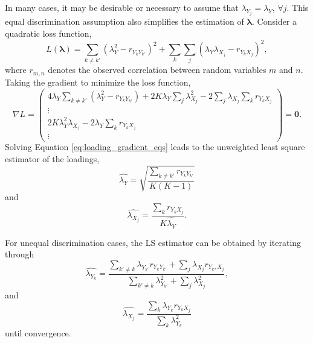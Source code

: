 \documentclass[man, floatsintext]{apa7}
\newcommand{\mbf}[1]{\bm{#1}}
\newcommand{\blambda}{\mbf{\lambda}}
\begin{document}
  In many cases, it may be desirable or necessary to assume that $\lambda_{Y_j}
  = \lambda_{Y}$, $\forall j$. This equal discrimination assumption also
  simplifies the estimation of $\blambda$. Consider a quadratic loss function,
  \begin{equation}
    L(\blambda) = \sum_{k \neq k'} (\lambda_{Y}^2 - r_{Y_k Y_{k'}})^2 + \sum_k
    \sum_j (\lambda_Y \lambda_{X_j} - r_{Y_k X_j})^2,
  \end{equation}
  where $r_{m, n}$ denotes the observed correlation between random variables $m$
  and $n$. Taking the gradient to minimize the loss function,
  \begin{equation}
  \label{eq:loading_gradient_eqs}
    \nabla L = \left(
    \begin{array}{c} 4\lambda_Y \sum_{k \neq k'}(\lambda_{Y}^{2} - r_{Y_k Y_
    {k'}}) + 2K\lambda_Y\sum_j\lambda_{X_j}^2 - 2\sum_j \lambda_{X_j} \sum_k r_
    {Y_k X_j}\\
    \vdots\\
    2K\lambda_Y^2\lambda_{X_j} - 2\lambda_Y\sum_k r_{Y_k X_j}\\
    \vdots
    \end{array}\right) = \mbf{0}.
  \end{equation}
  Solving Equation \ref{eq:loading_gradient_eqs} leads to the unweighted least
  square estimator of the loadings,
  \begin{equation}
    \hat{\lambda_Y} = \sqrt{\frac{\sum_{k \neq k'} r_{Y_k Y_{k'}}}{K(K-1)}}
  \end{equation}
  and
  \begin{equation}
    \hat{\lambda_{X_j}} = \frac{\sum_k r_{Y_k X_j}}{K\hat{\lambda_Y}}.
  \end{equation}

  For unequal discrimination cases, the LS estimator can be obtained by
  iterating through
  \begin{equation}
    \hat{\lambda_{Y_k}} = \frac{\sum_{k' \neq k} \lambda_{Y_{k'}} r_{Y_{k}Y_
    {k'}} + \sum_j \lambda_{X_j} r_{Y_k, X_j}}{\sum_{k' \neq k} \lambda_{Y_
    {k'}}^2 + \sum_j \lambda_{X_j}^2},
  \end{equation}
  and
  \begin{equation}
    \hat{\lambda_{X_j}} = \frac{\sum_k \lambda_{Y_k} r_{Y_k X_j}}{\sum_k
    \lambda_{Y_k}^2}
  \end{equation}
  until convergence. 
\end{document}
